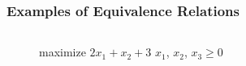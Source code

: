 \documentclass[32pt, aspectratio = 169]{beamer}
\begin{document}
\begin{frame}
  \frametitle{Examples of Equivalence Relations}
  \begin{columns}
    \begin{column}{.55\textwidth}
      \begin{figure}
        \begin{linearProg}{
            maximize
          }{
            $2x_1 + x_2 + 3$
          }{
          }{
            $x_1$, $x_2$, $x_3 \geq 0$
          }
        \end{linearProg}
      \end{figure}
    \end{column}
    \vrule{}

    \quad
    \begin{column}{.55\textwidth}
      \begin{overlayarea}{\textwidth}{.55\textheight}


\end{overlayarea}
\end{column}
\end{columns}
\end{frame}
\end{document}
